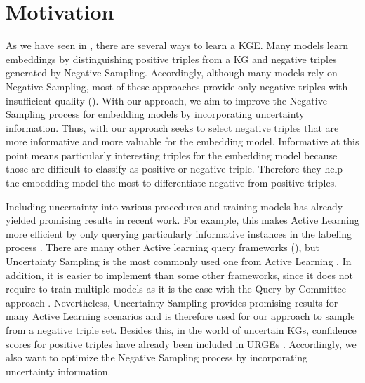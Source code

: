 \section{Motivation} 
\label{sec:motivation}


As we have seen in , there are several ways to learn a \ac{KGE}.
Many models learn embeddings by distinguishing positive triples from a \ac{KG} and negative triples generated by Negative Sampling.
Accordingly, although many models rely on Negative Sampling, most of these approaches provide only negative triples with insufficient quality ().
With our approach, we aim to improve the Negative Sampling process for embedding models by incorporating uncertainty information.
Thus, with our approach seeks to select negative triples that are more informative and more valuable for the embedding model.
Informative at this point means particularly interesting triples for the embedding model because those are difficult to classify as positive or negative triple.
Therefore they help the embedding model the most to differentiate negative from positive triples.

Including uncertainty into various procedures and training models has already yielded promising results in recent work.
For example, this makes Active Learning more efficient by only querying particularly informative instances in the labeling process .
There are many other Active learning query frameworks (), but Uncertainty Sampling is the most commonly used one from Active Learning \cite{Settles2009ActiveLL}.
In addition, it is easier to implement than some other frameworks, since it does not require to train multiple models as it is the case with the Query-by-Committee approach \cite{Settles2009ActiveLL}.
Nevertheless, Uncertainty Sampling provides promising results for many Active Learning scenarios and is therefore used for our approach to sample from a negative triple set.
Besides this, in the world of uncertain \acp{KG}, confidence scores for positive triples have already been included in \acp{URGE} \cite{UKGE}.
Accordingly, we also want to optimize the Negative Sampling process by incorporating uncertainty information.

